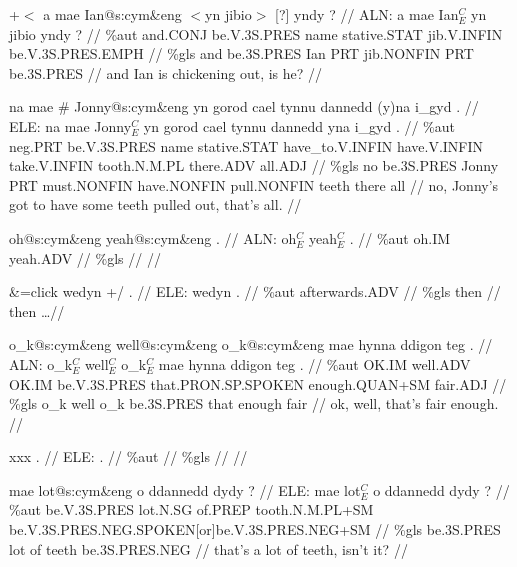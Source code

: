 \documentclass[a4paper,10pt]{article}
\begin{document}
\ex
\begingl[lingstyle=gergl]
\glchat +$<$ a mae Ian@s:cym\&eng $<$yn jibio$>$ [?] yndy ? //
\glsurface ALN:  a mae Ian$^{C}_{E}$ yn jibio yndy ?  //
\glauto \%aut  and{\scriptsize .CONJ} be{\scriptsize .V.3S.PRES} name stative{\scriptsize .STAT} jib{\scriptsize .V.INFIN} be{\scriptsize .V.3S.PRES.EMPH}   //
\glmanual \%gls  and be{\scriptsize .3S.PRES} Ian PRT jib{\scriptsize .NONFIN} PRT be{\scriptsize .3S.PRES}  //
\gleng and Ian is chickening out, is he? //
\endgl
\xe

\ex
\begingl[lingstyle=gergl]
\glchat na mae \# Jonny@s:cym\&eng yn gorod cael tynnu dannedd (y)na i\_gyd . //
\glsurface ELE:  na mae Jonny$^{C}_{E}$ yn gorod cael tynnu dannedd yna i\_gyd .  //
\glauto \%aut  neg{\scriptsize .PRT} be{\scriptsize .V.3S.PRES} name stative{\scriptsize .STAT} have\_to{\scriptsize .V.INFIN} have{\scriptsize .V.INFIN} take{\scriptsize .V.INFIN} tooth{\scriptsize .N.M.PL} there{\scriptsize .ADV} all{\scriptsize .ADJ}   //
\glmanual \%gls  no be{\scriptsize .3S.PRES} Jonny PRT must{\scriptsize .NONFIN} have{\scriptsize .NONFIN} pull{\scriptsize .NONFIN} teeth there all   //
\gleng no, Jonny's got to have some teeth pulled out, that's all. //
\endgl
\xe

\ex
\begingl[lingstyle=gergl]
\glchat oh@s:cym\&eng yeah@s:cym\&eng . //
\glsurface ALN:  oh$^{C}_{E}$ yeah$^{C}_{E}$ .  //
\glauto \%aut  oh{\scriptsize .IM} yeah{\scriptsize .ADV}   //
\glmanual \%gls      //
\gleng  //
\endgl
\xe

\ex
\begingl[lingstyle=gergl]
\glchat \&=click wedyn +/ . //
\glsurface ELE:  wedyn .  //
\glauto \%aut  afterwards{\scriptsize .ADV}   //
\glmanual \%gls  then   //
\gleng then \dots  //
\endgl
\xe

\ex
\begingl[lingstyle=gergl]
\glchat o\_k@s:cym\&eng well@s:cym\&eng o\_k@s:cym\&eng mae hynna ddigon teg . //
\glsurface ALN:  o\_k$^{C}_{E}$ well$^{C}_{E}$ o\_k$^{C}_{E}$ mae hynna ddigon teg .  //
\glauto \%aut  OK{\scriptsize .IM} well{\scriptsize .ADV} OK{\scriptsize .IM} be{\scriptsize .V.3S.PRES} that{\scriptsize .PRON.SP.SPOKEN} enough{\scriptsize .QUAN+SM} fair{\scriptsize .ADJ}   //
\glmanual \%gls  o\_k well o\_k be{\scriptsize .3S.PRES} that enough fair   //
\gleng ok, well, that's fair enough. //
\endgl
\xe

\ex
\begingl[lingstyle=gergl]
\glchat xxx . //
\glsurface ELE:  .  //
\glauto \%aut    //
\glmanual \%gls    //
\gleng  //
\endgl
\xe

\ex
\begingl[lingstyle=gergl]
\glchat mae lot@s:cym\&eng o ddannedd dydy ? //
\glsurface ELE:  mae lot$^{C}_{E}$ o ddannedd dydy ?  //
\glauto \%aut  be{\scriptsize .V.3S.PRES} lot{\scriptsize .N.SG} of{\scriptsize .PREP} tooth{\scriptsize .N.M.PL+SM} be{\scriptsize .V.3S.PRES.NEG.SPOKEN[or]be.V.3S.PRES.NEG+SM}   //
\glmanual \%gls  be{\scriptsize .3S.PRES} lot of teeth be{\scriptsize .3S.PRES.NEG}   //
\gleng that's a lot of teeth, isn't it? //
\endgl
\xe
\end{document}
